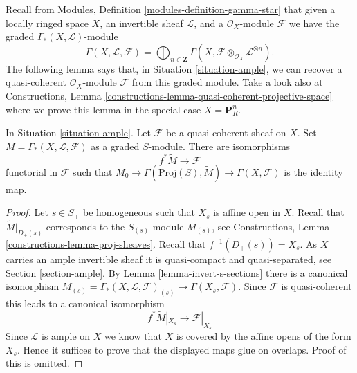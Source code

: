 \noindent
Recall from Modules, Definition \ref{modules-definition-gamma-star}
that given a locally ringed space $X$, an invertible sheaf $\mathcal{L}$,
and a $\mathcal{O}_X$-module $\mathcal{F}$ we have the graded
$\Gamma_*(X, \mathcal{L})$-module
$$
\Gamma(X, \mathcal{L}, \mathcal{F}) =
\bigoplus\nolimits_{n \in \mathbf{Z}}
\Gamma(X, \mathcal{F} \otimes_{\mathcal{O}_X} \mathcal{L}^{\otimes n}).
$$
The following lemma says that, in Situation \ref{situation-ample},
we can recover a quasi-coherent $\mathcal{O}_X$-module $\mathcal{F}$
from this graded module. Take a look also at
Constructions, Lemma \ref{constructions-lemma-quasi-coherent-projective-space}
where we prove this lemma in the special case $X = \mathbf{P}^n_R$.

\begin{lemma}
\label{lemma-ample-quasi-coherent}
In Situation \ref{situation-ample}.
Let $\mathcal{F}$ be a quasi-coherent sheaf on $X$.
Set $M = \Gamma_*(X, \mathcal{L}, \mathcal{F})$ as a graded $S$-module.
There are isomorphisms
$$
f^*\widetilde{M} \longrightarrow \mathcal{F}
$$
functorial in $\mathcal{F}$ such that
$M_0 \to \Gamma(\text{Proj}(S), \widetilde{M}) \to \Gamma(X, \mathcal{F})$
is the identity map.
\end{lemma}

\begin{proof}
Let $s \in S_{+}$ be homogeneous such that $X_s$ is affine open in $X$.
Recall that $\widetilde{M}|_{D_{+}(s)}$ corresponds to the
$S_{(s)}$-module $M_{(s)}$, see
Constructions, Lemma \ref{constructions-lemma-proj-sheaves}.
Recall that $f^{-1}(D_{+}(s)) = X_s$.
As $X$ carries an ample invertible sheaf it is quasi-compact and
quasi-separated, see Section \ref{section-ample}.
By Lemma \ref{lemma-invert-s-sections} there is a canonical isomorphism
$M_{(s)} = \Gamma_*(X, \mathcal{L}, \mathcal{F})_{(s)} \to
\Gamma(X_s, \mathcal{F})$.
Since $\mathcal{F}$ is quasi-coherent this leads to
a canonical isomorphism
$$
f^*\widetilde{M}|_{X_s} \to \mathcal{F}|_{X_s}
$$
Since $\mathcal{L}$ is ample on $X$ we know that $X$ is covered
by the affine opens of the form $X_s$. Hence it suffices to prove
that the displayed maps glue on overlaps. Proof of this is
omitted.
\end{proof}


